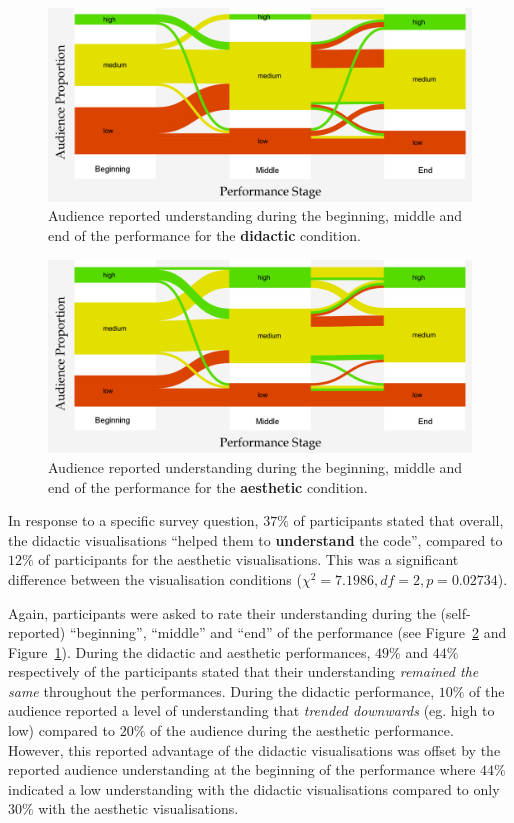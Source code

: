 \begin{figure}
\centering
\includegraphics[width=\columnwidth]{../study-2/results/graphs/didactic-understanding-final}
\caption{Audience reported understanding during the beginning, middle
  and end of the performance for the \textbf{didactic} condition.}
\label{fig:didactic-understanding}
\end{figure}

\begin{figure}
\centering
\includegraphics[width=\columnwidth]{../study-2/results/graphs/aesthetic-understanding-final}
\caption{Audience reported understanding during the beginning, middle
  and end of the performance for the \textbf{aesthetic} condition.}
\label{fig:aesthetic-understanding}
\end{figure}

In response to a specific survey question, $37\%$ of participants
stated that overall, the didactic visualisations ``helped them to
\textbf{understand} the code'', compared to $12\%$ of participants for the
aesthetic visualisations. This was a significant difference between
the visualisation conditions ($\chi^2=7.1986,df=2,p=0.02734$).

Again, participants were asked to rate their understanding during the
(self-reported) ``beginning'', ``middle'' and ``end'' of the
performance (see Figure~\ref{fig:aesthetic-understanding} and
Figure~\ref{fig:didactic-understanding}). During the didactic and
aesthetic performances, $49\%$ and $44\%$ respectively of the
participants stated that their understanding \emph{remained the same}
throughout the performances. During the didactic performance, $10\%$
of the audience reported a level of understanding that \emph{trended
  downwards} (eg. high to low) compared to $20\%$ of the audience
during the aesthetic performance. However, this reported advantage of
the didactic visualisations was offset by the reported audience
understanding at the beginning of the performance where $44\%$
indicated a low understanding with the didactic visualisations
compared to only $30\%$ with the aesthetic visualisations. 

